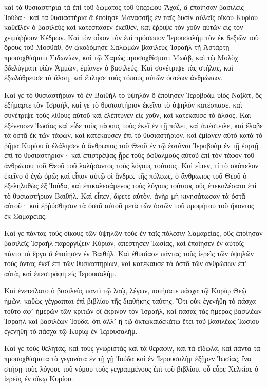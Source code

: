 {καὶ τὰ θυσιαστήρια τὰ ἐπὶ τοῦ δώματος τοῦ ὑπερῴου Ἄχαζ, ἃ ἐποίησαν βασιλεὶς Ἰούδα· καὶ τὰ θυσιαστήρια ἃ ἐποίησε Μανασσῆς ἐν ταῖς δυσὶν αὐλαῖς οἴκου Κυρίου καθεῖλεν ὁ βασιλεὺς καὶ κατέσπασεν ἐκεῖθεν, καὶ ἔῤῥιψε τὸν χοῦν αὐτῶν εἰς τὸν χειμάῤῥουν Κέδρων.
Καὶ τὸν οἶκον τὸν ἐπὶ πρόσωπον Ἱερουσαλὴμ τὸν ἐκ δεξιῶν τοῦ ὄρους τοῦ Μοσθὰθ, ὃν ᾠκοδόμησε Σαλωμὼν βασιλεὺς Ἰσραὴλ τῇ Ἀστάρτῃ προσοχθίσματι Σιδωνίων, καὶ τῷ Χαμὼς προσοχθίσματι Μωὰβ, καὶ τῷ Μολὸχ βδελύγματι υἱῶν Ἀμμὼν, ἐμίανεν ὁ βασιλεύς.
Καὶ συνέτριψε τὰς στήλας, καὶ ἐξωλόθρευσε τὰ ἄλση, καὶ ἔπλησε τοὺς τόπους αὐτῶν ὀστέων ἀνθρώπων.
\par }{\PP {}Καί γε τὸ θυσιαστήριον τὸ ἐν Βαιθὴλ τὸ ὑψηλὸν ὃ ἐποίησεν Ἱεροβοὰμ υἱὸς Ναβὰτ, ὃς ἐξήμαρτε τὸν Ἰσραὴλ, καί γε τὸ θυσιαστήριον ἐκεῖνο τὸ ὑψηλὸν κατέσπασε, καὶ συνέτριψε τοὺς λίθους αὐτοῦ καὶ ἐλέπτυνεν εἰς χοῦν, καὶ κατέκαυσε τὸ ἄλσος.
Καὶ ἐξένευσεν Ἰωσίας καὶ εἶδε τοὺς τάφους τοὺς ἐκεῖ ἐν τῇ πόλει, καὶ ἀπέστειλε, καὶ ἔλαβε τὰ ὀστᾶ ἐκ τῶν τάφων, καὶ κατέκαυσεν ἐπὶ τὸ θυσιαστήριον, καὶ ἐμίανεν αὐτὸ κατὰ τὸ ῥῆμα Κυρίου ὃ ἐλάλησεν ὁ ἄνθρωπος τοῦ Θεοῦ ἐν τῷ ἑστᾶναι Ἱεροβοὰμ ἐν τῇ ἑορτῇ ἐπὶ τὸ θυσιαστήριον· καὶ ἐπιστρέψας ᾖρε τοὺς ὀφθαλμοὺς αὐτοῦ ἐπὶ τὸν τάφον τοῦ ἀνθρώπου τοῦ Θεοῦ τοῦ λαλήσαντος τοὺς λόγους τούτους.
Καὶ εἶπεν, τί τὸ σκόπελον ἐκεῖνο ὃ ἐγὼ ὁρῶ; καὶ εἶπον αὐτῷ οἱ ἄνδρες τῆς πόλεως, ὁ ἄνθρωπος τοῦ Θεοῦ ὁ ἐξεληλυθὼς ἐξ Ἰούδα, καὶ ἐπικαλεσάμενος τοὺς λόγους τούτους οὓς ἐπεκαλέσατο ἐπὶ τὸ θυσιαστήριον Βαιθήλ.
Καὶ εἶπεν, ἄφετε αὐτὸν, ἀνὴρ μὴ κινησάτωσαν τὰ ὀστᾶ αὐτοῦ· καὶ ἐῤῥύσθησαν τὰ ὀστᾶ αὐτοῦ μετὰ τῶν ὀστῶν τοῦ προφήτου τοῦ ἥκοντος ἐκ Σαμαρείας.
\par }{\PP {}Καί γε πάντας τοὺς οἴκους τῶν ὑψηλῶν τοὺς ἐν ταῖς πόλεσιν Σαμαρείας, οὓς ἐποίησαν βασιλεῖς Ἰσραὴλ παροργίζειν Κύριον, ἀπέστησεν Ἰωσίας, καὶ ἐποίησεν ἐν αὐτοῖς πάντα τὰ ἔργα ἃ ἐποίησεν ἐν Βαιθήλ.
Καὶ ἐθυσίασε πάντας τοὺς ἱερεῖς τῶν ὑψηλῶν τοὺς ὄντας ἐκεῖ ἐπὶ τῶν θυσιαστηρίων, καὶ κατέκαυσε τὰ ὀστᾶ τῶν ἀνθρώπων ἐπʼ αὐτὰ, καὶ ἐπεστράφη εἰς Ἱερουσαλήμ.
\par }{\PP {}Καὶ ἐνετείλατο ὁ βασιλεὺς παντὶ τῷ λαῷ, λέγων, ποιήσατε πάσχα τῷ Κυρίῳ Θεῷ ἡμῶν, καθὼς γέγραπται ἐπὶ βιβλίου τῆς διαθήκης ταύτης.
Ὅτι οὐκ ἐγενήθη τὸ πάσχα τοῦτο ἀφʼ ἡμερῶν τῶν κριτῶν οἳ ἔκρινον τὸν Ἰσραὴλ, καὶ πάσας τὰς ἡμέρας βασιλέων Ἰσραὴλ καὶ βασιλέων Ἰούδα.
ὅτι ἀλλʼ ἢ τῷ ὀκτωκαιδεκάτῳ ἔτει τοῦ βασιλέως Ἰωσίου ἐγενήθη τὸ πάσχα τῷ Κυρίῳ ἐν Ἰερουσαλήμ.
\par }{\PP {}Καί γε τοὺς θελητὰς, καὶ τοὺς γνωριστὰς καὶ τὰ θεραφὶν, καὶ τὰ εἴδωλα, καὶ πάντα τὰ προσοχθίσματα τὰ γεγονότα ἐν τῇ γῇ Ἰούδα καὶ ἐν Ἱερουσαλὴμ ἐξῇρεν Ἰωσίας, ἵνα στήσῃ τοὺς λόγους τοῦ νόμου τοὺς γεγραμμένους ἐπὶ τοῦ βιβλίου, οὗ εὗρε Χελκίας ὁ ἱερεὺς ἐν οἴκῳ Κυρίου.
}
